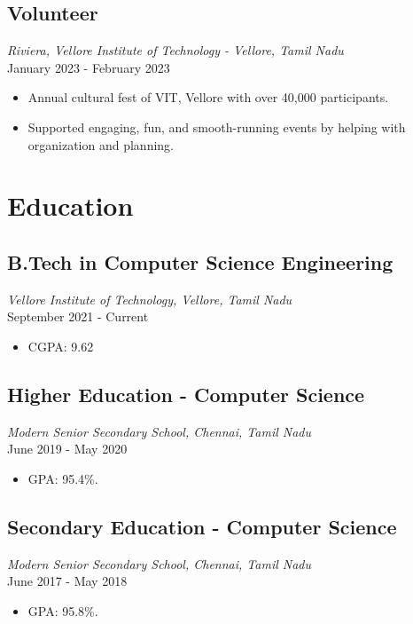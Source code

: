 \documentclass[a4paper,10pt]{article}
\begin{document}
\subsection*{\large\textbf{Volunteer}}
\textit{Riviera, Vellore Institute of Technology - Vellore, Tamil Nadu} \\
January 2023 - February 2023
\begin{itemize}
    \item Annual cultural fest of VIT, Vellore with over 40,000 participants.
    \item Supported engaging, fun, and smooth-running events by helping with organization and planning.
\end{itemize}

\vspace{10pt}

\section*{Education}
\subsection*{\large\textbf{B.Tech in Computer Science Engineering}}
\textit{Vellore Institute of Technology, Vellore, Tamil Nadu} \\
September 2021 - Current
\begin{itemize}
    \item CGPA: 9.62
\end{itemize}

\subsection*{\large\textbf{Higher Education - Computer Science}}
\textit{Modern Senior Secondary School, Chennai, Tamil Nadu} \\
June 2019 - May 2020
\begin{itemize}
    \item GPA: 95.4\%.
\end{itemize}

\subsection*{\large\textbf{Secondary Education - Computer Science}}
\textit{Modern Senior Secondary School, Chennai, Tamil Nadu} \\
June 2017 - May 2018
\begin{itemize}
    \item GPA: 95.8\%.
\end{itemize}
\end{document}
